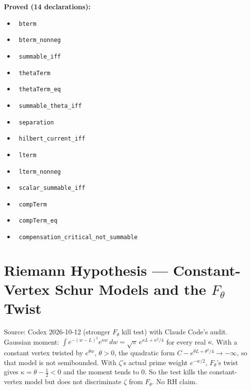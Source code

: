 \documentclass{report}
\theoremstyle{definition}
\begin{document}
\noindent\textbf{Proved (14 declarations):}
\begin{itemize}
  \item {}\leanok\ \texttt{bterm}
  \item {}\leanok\ \texttt{bterm\_nonneg}
  \item {}\leanok\ \texttt{summable\_iff}
  \item {}\leanok\ \texttt{thetaTerm}
  \item {}\leanok\ \texttt{thetaTerm\_eq}
  \item {}\leanok\ \texttt{summable\_theta\_iff}
  \item {}\leanok\ \texttt{separation}
  \item {}\leanok\ \texttt{hilbert\_current\_iff}
  \item {}\leanok\ \texttt{lterm}
  \item {}\leanok\ \texttt{lterm\_nonneg}
  \item {}\leanok\ \texttt{scalar\_summable\_iff}
  \item {}\leanok\ \texttt{compTerm}
  \item {}\leanok\ \texttt{compTerm\_eq}
  \item {}\leanok\ \texttt{compensation\_critical\_not\_summable}
\end{itemize}

\section{Riemann Hypothesis --- Constant-Vertex Schur Models and the $F_\theta$ Twist}
Source: Codex 2026-10-12 (stronger $F_\theta$ kill test) with Claude Code's audit. Gaussian moment: $\int e^{-(w-L)^2}e^{\kappa w}\,dw=\sqrt\pi\,e^{\kappa L+\kappa^2/4}$ for every real $\kappa$. With a constant vertex twisted by $e^{\theta w}$, $\theta>0$, the quadratic form $C-e^{\theta L+\theta^2/4}\to-\infty$, so that model is not semibounded. With $\zeta$'s actual prime weight $e^{-w/2}$, $F_\theta$'s twist gives $\kappa=\theta-\tfrac12<0$ and the moment tends to $0$. So the test kills the constant-vertex model but does not discriminate $\zeta$ from $F_\theta$. No RH claim.
\end{document}
